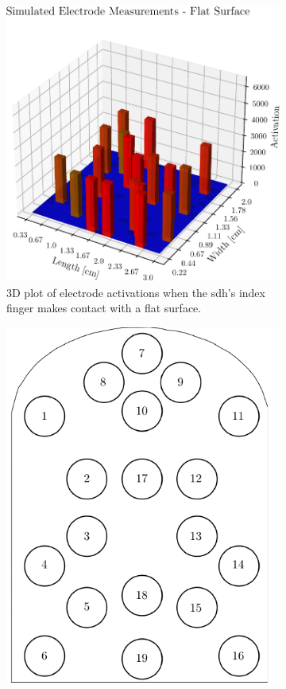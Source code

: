 \begin{figure}[!h]
	\centering
	\begin{subfigure}[b]{0.48\textwidth}
		\centering
		\includegraphics[width=\textwidth]{chapters/1-tactile-perception/fig/matplotlib/pressure-distribution.pdf}
		\caption{3D plot of electrode activations when the \gls{sdh}'s index finger makes contact with a flat surface.}
		\label{fig:simulated-electrode-distribution}
	\end{subfigure}
	\hfill
	\begin{subfigure}[b]{0.48\textwidth}
		\centering
		\includegraphics[height=\textwidth]{chapters/1-tactile-perception/fig/drawio/electrode-map.pdf}

\end{subfigure}
\end{figure}
